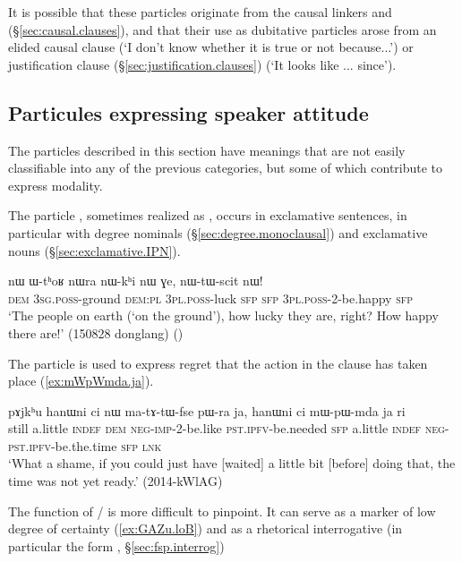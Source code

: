 It is possible that these particles originate from the causal linkers  and  (§\ref{sec:causal.clauses}), and that their use as dubitative particles arose from an elided causal clause (`I don't know whether it is true or not because...') or justification clause (§\ref{sec:justification.clauses}) (`It looks like ... since').

\subsection{Particules expressing speaker attitude} \label{sec:fsp.attitude}
The particles described in this section have meanings that are not easily classifiable into any of the previous categories, but some of which contribute to express modality.
 
The particle , sometimes realized as , occurs in exclamative sentences, in particular with degree nominals (§\ref{sec:degree.monoclausal}) and exclamative nouns (§\ref{sec:exclamative.IPN}).

\begin{exe} 
\ex \label{ex:nWtWscit.nW}
\gll  nɯ ɯ-tʰoʁ nɯra nɯ-kʰi nɯ ɣe, nɯ-tɯ-scit nɯ! \\
\textsc{dem} \textsc{3sg}.\textsc{poss}-ground \textsc{dem}:\textsc{pl} \textsc{3pl}.\textsc{poss}-luck \textsc{sfp} \textsc{sfp}  \textsc{3pl}.\textsc{poss}-2-be.happy \textsc{sfp} \\
\glt `The people on earth (`on the ground'), how lucky they are, right? How happy there are!' (150828 donglang) 
()
\end{exe} 

The particle  is used to express regret that the action in the clause has taken place (\ref{ex:mWpWmda.ja}).

\begin{exe} 
\ex \label{ex:mWpWmda.ja}
\gll   pɤjkʰu hanɯni ci nɯ ma-tɤ-tɯ-fse pɯ-ra ja, hanɯni ci mɯ-pɯ-mda ja ri \\
still a.little \textsc{indef} \textsc{dem} \textsc{neg}-\textsc{imp}-2-be.like \textsc{pst}.\textsc{ipfv}-be.needed \textsc{sfp} 
 a.little \textsc{indef}   \textsc{neg}-\textsc{pst}.\textsc{ipfv}-be.the.time \textsc{sfp}  \textsc{lnk} \\
\glt `What a shame, if you could just have [waited] a little bit [before] doing that, the time was not yet ready.' (2014-kWlAG)
\end{exe} 

The function of  /  is more difficult to pinpoint. It can serve as a marker of low degree of certainty (\ref{ex:GAZu.loB}) and as a rhetorical interrogative (in particular the form , §\ref{sec:fsp.interrog})


